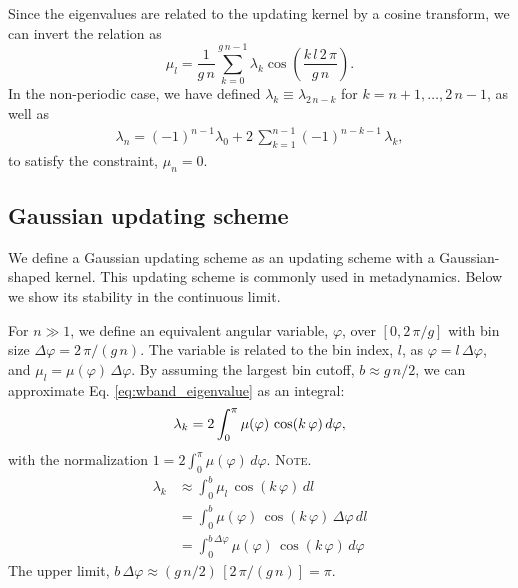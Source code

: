 \documentclass[reprint, superscriptaddress, floatfix]{revtex4-1}
\newcommand{\note}[1]{{\color{DarkGreen}\footnotesize \textsc{Note.} #1}}
\begin{document}
Since the eigenvalues are related to the updating kernel
by a cosine transform,
we can invert the relation as
%
\begin{equation}
  \mu_l
  =
  \frac { 1 } { g \, n }
  \sum_{ k = 0 }^{ g \, n - 1 }
  \lambda_k
  \cos \left(
       \frac{ k \, l \, 2 \, \pi }
            {      g \, n        }
  \right)
  .
\label{eq:mu_from_lambda}
\end{equation}
%
In the non-periodic case,
we have defined
$\lambda_k \equiv \lambda_{2 \, n - k}$
for $k = n + 1, \dots, 2 \, n - 1$,
as well as
%
\begin{align}
  \lambda_n
  =
  (-1)^{ n - 1 }
  \lambda_0
  +
  2 \, \sum_{ k = 1 }^{ n - 1 }
      (-1)^{n - k - 1} \, \lambda_k
  ,
\label{eq:lambdan}
\end{align}
to satisfy the constraint, $\mu_n = 0$.
%





\subsection{Gaussian updating scheme}



We define a Gaussian updating scheme
as an updating scheme with a
Gaussian-shaped kernel.
%
This updating scheme is commonly
used in metadynamics.
%
Below we show its stability
in the continuous limit.



For $n \gg 1$,
we define an equivalent angular variable, $\varphi$,
over $[0, 2 \, \pi/g]$
with bin size
$\Delta \varphi = 2 \, \pi/(g \, n)$.
The variable is related to the bin index, $l$, as
$\varphi = l \, \Delta \varphi$,
and
$\mu_l = \mu(\varphi) \, \Delta \varphi$.
%
By assuming the largest bin cutoff, $b \approx g \, n/2$,
we can approximate Eq. \eqref{eq:wband_eigenvalue}
as an integral:
%
\begin{equation}
  \lambda_k
  =
  2 \int_0^\pi
    \mu(\varphi) \, \cos (k \, \varphi) \, d\varphi,
\notag
\end{equation}
%
with the normalization
%
$
  1 = 2 \int_0^\pi \mu(\varphi) \, d\varphi.
$
\note{
\begin{align*}
  \lambda_k
  &\approx
  \int_0^b \mu_l \, \cos(k \, \varphi) \, dl
  \\
  &=
  \int_0^b \mu(\varphi) \, \cos(k \, \varphi) \, \Delta \varphi \, dl
  \\
  &=
  \int_0^{b \, \Delta \varphi} \mu(\varphi) \, \cos(k \, \varphi) \, d\varphi
\end{align*}
The upper limit,
$b \, \Delta \varphi \approx (g\,n/2) \, [2\,\pi/(g\,n)] = \pi$.
}
\end{document}
